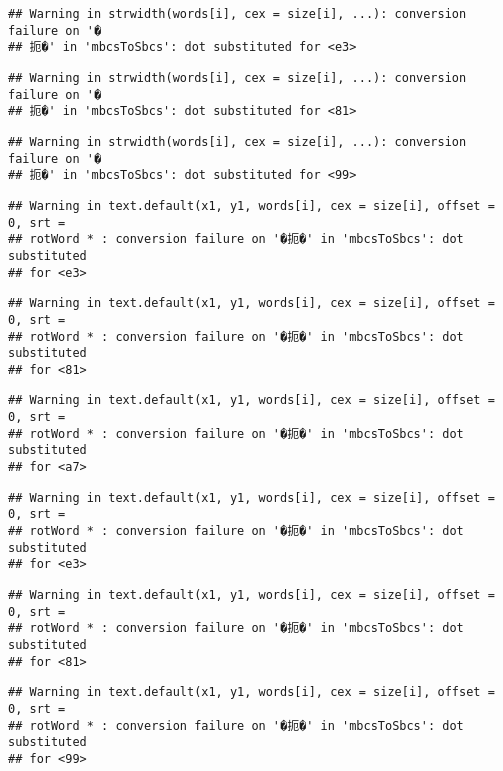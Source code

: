 \documentclass[]{article}
\begin{document}
\begin{verbatim}
## Warning in strwidth(words[i], cex = size[i], ...): conversion failure on '�
## 扼�' in 'mbcsToSbcs': dot substituted for <e3>
\end{verbatim}

\begin{verbatim}
## Warning in strwidth(words[i], cex = size[i], ...): conversion failure on '�
## 扼�' in 'mbcsToSbcs': dot substituted for <81>
\end{verbatim}

\begin{verbatim}
## Warning in strwidth(words[i], cex = size[i], ...): conversion failure on '�
## 扼�' in 'mbcsToSbcs': dot substituted for <99>
\end{verbatim}

\begin{verbatim}
## Warning in text.default(x1, y1, words[i], cex = size[i], offset = 0, srt =
## rotWord * : conversion failure on '�扼�' in 'mbcsToSbcs': dot substituted
## for <e3>
\end{verbatim}

\begin{verbatim}
## Warning in text.default(x1, y1, words[i], cex = size[i], offset = 0, srt =
## rotWord * : conversion failure on '�扼�' in 'mbcsToSbcs': dot substituted
## for <81>
\end{verbatim}

\begin{verbatim}
## Warning in text.default(x1, y1, words[i], cex = size[i], offset = 0, srt =
## rotWord * : conversion failure on '�扼�' in 'mbcsToSbcs': dot substituted
## for <a7>
\end{verbatim}

\begin{verbatim}
## Warning in text.default(x1, y1, words[i], cex = size[i], offset = 0, srt =
## rotWord * : conversion failure on '�扼�' in 'mbcsToSbcs': dot substituted
## for <e3>
\end{verbatim}

\begin{verbatim}
## Warning in text.default(x1, y1, words[i], cex = size[i], offset = 0, srt =
## rotWord * : conversion failure on '�扼�' in 'mbcsToSbcs': dot substituted
## for <81>
\end{verbatim}

\begin{verbatim}
## Warning in text.default(x1, y1, words[i], cex = size[i], offset = 0, srt =
## rotWord * : conversion failure on '�扼�' in 'mbcsToSbcs': dot substituted
## for <99>
\end{verbatim}
\end{document}
